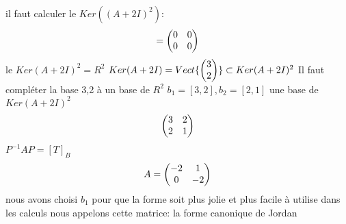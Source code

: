 \documentclass[a4paper,10pt]{article}
\begin{document}
\paragraph{}
il faut calculer le $Ker((A+2I)^2)$:
\newline
\[
=
\begin{pmatrix}
 0&0\cr
 0&0\cr
\end{pmatrix}
\]
\newline
le $Ker(A+2I)^2=R^2$
\newline
$Ker(A+2I)=Vect\{\begin{pmatrix}
                  3\cr
                  2\cr
                 \end{pmatrix}
                 \}
\subset Ker(A+2I)^2
$
\newline
Il faut compléter la base 3,2 à un base de $R^2$
\newline
$b_1=[3,2],b_2=[2,1]$ une base de $Ker(A+2I)^2$
\newline
\[
\begin{pmatrix}
 3&2\cr
 2&1\cr
\end{pmatrix}
\]
\newline
$P^{-1}AP=[T]_B$
\newline
\[
A=
\begin{pmatrix}
 -2&1\cr
 0&-2\cr
\end{pmatrix}
\]
\newline
nous avons choisi $b_1$ pour que la forme soit plus jolie et plus facile à utilise dans les calculs
\newline
nous appelons cette matrice: la forme canonique de Jordan
\end{document}
